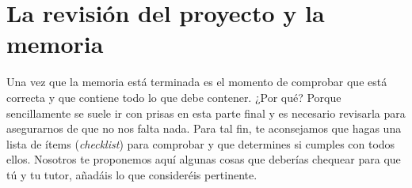 \chapter{La revisión del proyecto y la memoria}
\label{cap:Revisión}


Una vez que la memoria está terminada es el momento de comprobar que está correcta y que contiene todo lo que debe contener. ¿Por qué? Porque sencillamente se suele ir con prisas en esta parte final y es necesario revisarla para asegurarnos de que no nos falta nada. Para tal fin, te aconsejamos que hagas una lista de ítems ({\it checklist}) para comprobar y que determines si cumples con todos ellos. Nosotros te proponemos aquí algunas cosas que deberías chequear para que tú y tu tutor, añadáis lo que consideréis pertinente.


